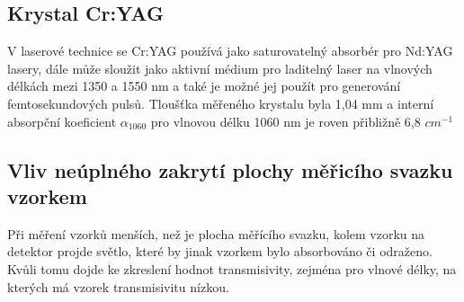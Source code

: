 	\subsection{Krystal Cr:YAG}
	V laserové technice se Cr:YAG používá jako saturovatelný absorbér pro Nd:YAG lasery, dále může sloužit jako aktivní médium pro laditelný laser na vlnových délkách mezi 1350 a 1550 nm a také je možné jej použít pro generování femtosekundových pulsů.
	Tloušťka měřeného krystalu byla 1,04 mm a interní absorpční koeficient $\alpha_{1060}$ pro vlnovou délku 1060 nm je roven přibližně 6,8 $\unit{cm^{-1}}$
 			

	\subsection{Vliv neúplného zakrytí plochy měřicího svazku vzorkem}
		Při měření vzorků menších, než je plocha měřícího svazku, kolem vzorku na detektor projde světlo, které by jinak vzorkem bylo absorbováno či odraženo. Kvůli tomu dojde ke zkreslení hodnot transmisivity, zejména pro vlnové délky, na kterých má vzorek transmisivitu nízkou. 

			



